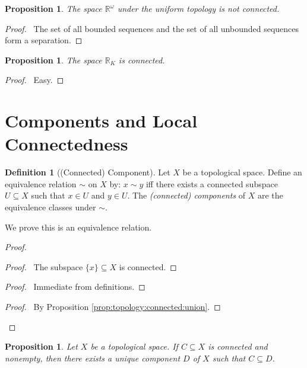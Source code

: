 \documentclass{report}
\let\qed\relax
\newtheorem{prop}[lm]{Proposition}
\theoremstyle{definition}
\newtheorem{df}[lm]{Definition}
\begin{document}
  \begin{prop}
   The space $\mathbb{R}^\omega$ under the uniform topology is not connected.
 \end{prop}

 \begin{proof}
  \pf\ The set of all bounded sequences and the set of all unbounded sequences
form a separation. \qed
 \end{proof}

 \begin{prop}
  The space $\mathbb{R}_K$ is connected.
\end{prop}

\begin{proof}
 \pf\ Easy. \qed
\end{proof}

  \section{Components and Local Connectedness}

  \begin{df}[(Connected) Component]
    Let $X$ be a topological space. Define an equivalence relation $\sim$ on
    $X$
    by: $x \sim y$ iff there exists a connected subspace $U \subseteq X$ such
    that $x \in U$ and $y \in U$. The \emph{(connected) components} of $X$ are
    the equivalence classes under $\sim$.

    We prove this is an equivalence relation.
  \end{df}

  \begin{proof}
    \pf
    \begin{proof}
      \pf\ The subspace $\{x\} \subseteq X$ is connected.
    \end{proof}
    \begin{proof}
      \pf\ Immediate from definitions.
    \end{proof}
    \begin{proof}
      \pf\ By Proposition \ref{prop:topology:connected:union}.
    \end{proof}
    \qed
  \end{proof}

  \begin{prop}
    \label{prop:topology:connected:subset}
    Let $X$ be a topological space. If $C \subseteq X$ is connected and
    nonempty, then there    exists a unique component $D$ of $X$ such that $C
    \subseteq D$.
  \end{prop}
\end{document}
